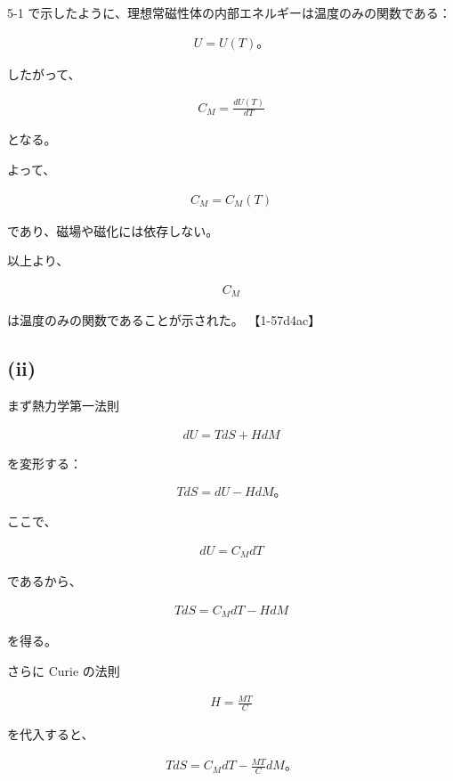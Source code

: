 \documentclass[platex,dvipdfmx,a4paper]{jsarticle}
\begin{document}
5-1 で示したように、理想常磁性体の内部エネルギーは温度のみの関数である：

\begin{align*}
U=U(T)。
\end{align*}

したがって、

\begin{align*}
C_M
=
\frac{dU(T)}{dT}
\end{align*}

となる。

よって、

\begin{align*}
C_M=C_M(T)
\end{align*}

であり、磁場や磁化には依存しない。

以上より、

\begin{align*}
C_M
\end{align*}

は温度のみの関数であることが示された。 【1-57d4ac】

\subsection{(ii)}

まず熱力学第一法則

\begin{align*}
dU
=
TdS+HdM
\end{align*}

を変形する：

\begin{align*}
TdS
=
dU-HdM。
\end{align*}

ここで、

\begin{align*}
dU
=
C_MdT
\end{align*}

であるから、

\begin{align*}
TdS
=
C_MdT-HdM
\end{align*}

を得る。

さらに Curie の法則

\begin{align*}
H=\frac{MT}{C}
\end{align*}

を代入すると、

\begin{align*}
TdS
=
C_MdT
-
\frac{MT}{C}dM。
\end{align*}
\end{document}
